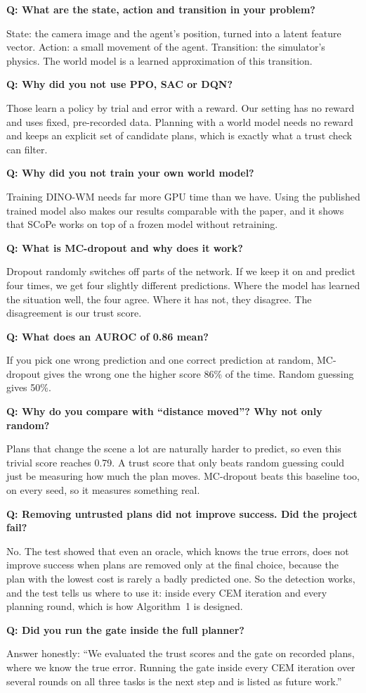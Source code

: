 \documentclass[11pt,a4paper]{article}
\newcommand{\Q}[1]{\par\medskip\noindent\textbf{\color{accent}Q: #1}\par\nopagebreak}
\newcommand{\A}{\noindent}
\begin{document}
\Q{What are the state, action and transition in your problem?}
\A State: the camera image and the agent's position, turned into a latent feature vector. Action: a small movement of
the agent. Transition: the simulator's physics. The world model is a learned approximation of this transition.

\Q{Why did you not use PPO, SAC or DQN?}
\A Those learn a policy by trial and error with a reward. Our setting has no reward and uses fixed, pre-recorded data.
Planning with a world model needs no reward and keeps an explicit set of candidate plans, which is exactly what a
trust check can filter.

\Q{Why did you not train your own world model?}
\A Training DINO-WM needs far more GPU time than we have. Using the published trained model also makes our results
comparable with the paper, and it shows that SCoPe works on top of a frozen model without retraining.

\Q{What is MC-dropout and why does it work?}
\A Dropout randomly switches off parts of the network. If we keep it on and predict four times, we get four slightly
different predictions. Where the model has learned the situation well, the four agree. Where it has not, they
disagree. The disagreement is our trust score.

\Q{What does an AUROC of 0.86 mean?}
\A If you pick one wrong prediction and one correct prediction at random, MC-dropout gives the wrong one the higher
score 86\% of the time. Random guessing gives 50\%.

\Q{Why do you compare with ``distance moved''? Why not only random?}
\A Plans that change the scene a lot are naturally harder to predict, so even this trivial score reaches 0.79. A trust
score that only beats random guessing could just be measuring how much the plan moves. MC-dropout beats this baseline
too, on every seed, so it measures something real.

\Q{Removing untrusted plans did not improve success. Did the project fail?}
\A No. The test showed that even an oracle, which knows the true errors, does not improve success when plans are
removed only at the final choice, because the plan with the lowest cost is rarely a badly predicted one. So the
detection works, and the test tells us where to use it: inside every CEM iteration and every planning round, which is
how Algorithm~1 is designed.

\Q{Did you run the gate inside the full planner?}
\A Answer honestly: ``We evaluated the trust scores and the gate on recorded plans, where we know the true error.
Running the gate inside every CEM iteration over several rounds on all three tasks is the next step and is listed as
future work.''
\end{document}
